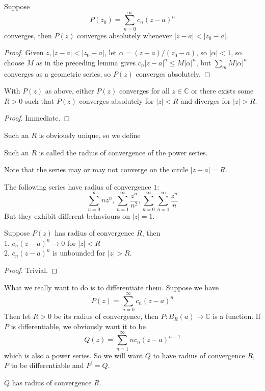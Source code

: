 \begin{theorem}
    Suppose
    $$P(z_0)=\sum_{n=0}^\infty c_n(z-a)^n$$
    converges, then $P(z)$ converges absolutely whenever $|z-a|<|z_0-a|$.
\end{theorem}
\begin{proof}
    Given $z,|z-a|<|z_0-a|$, let $\alpha=(z-a)/(z_0-a)$, so $|\alpha|<1$, so choose $M$ as in the preceding lemma gives $c_n|z-a|^n\le M|\alpha|^n$, but $\sum_mM|\alpha|^n$ converges as a geometric series, so $P(z)$ converges absolutely.
\end{proof}
\begin{corollary}
    With $P(z)$ as above, either $P(z)$ converges for all $z\in\mathbb C$ or there exists some $R>0$ such that $P(z)$ converges absolutely for $|z|<R$ and diverges for $|z|>R$.
\end{corollary}
\begin{proof}
    Immediate.
\end{proof}
Such an $R$ is obviously unique, so we define
\begin{definition}
    Such an $R$ is called the radius of convergence of the power series.
\end{definition}
Note that the series may or may not converge on the circle $|z-a|=R$.
\begin{example}
    The following series have radius of convergence $1$:
    $$\sum_{n=0}^\infty nz^n,\sum_{n=1}^\infty\frac{z^n}{n^2},\sum_{n=0}^\infty\sum_{n=1}^\infty\frac{z^n}{n}$$
    But they exhibit different behaviours on $|z|=1$.
\end{example}
\begin{proposition}
    Suppose $P(z)$ has radius of convergence $R$, then\\
    1. $c_n(z-a)^n\to 0$ for $|z|<R$\\
    2. $c_n(z-a)^n$ is unbounded for $|z|>R$.
\end{proposition}
\begin{proof}
    Trivial.
\end{proof}
What we really want to do is to differentiate them.
Suppose we have
$$P(z)=\sum_{n=0}^\infty c_n(z-a)^n$$
Then let $R>0$ be its radius of convergence, then $P:B_R(a)\to\mathbb C$ is a function.
If $P$ is differentiable, we obviously want it to be
$$Q(z)=\sum_{n=1}^\infty nc_n(z-a)^{n-1}$$
which is also a power series.
So we will want $Q$ to have radius of convergence $R$, $P$ to be differentiable and $P^\prime=Q$.
\begin{proposition}
    $Q$ has radius of convergence $R$.
\end{proposition}
